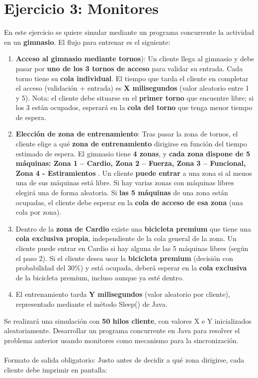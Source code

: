\documentclass[a4paper,12pt,titlepage,oneside]{article}
\begin{document}
\section{Ejercicio 3: Monitores}
\iffalse
    En este ejercicio se quiere simular mediante un programa concurrente la actividad en 
    un \textbf{gimnasio}. El flujo para entrenar es el siguiente: 
    \begin{enumerate}
        \item \textbf{Acceso al gimnasio mediante tornos}): Un cliente llega al gimnasio y debe pasar 
        por \textbf{uno de los 3 tornos de acceso} para validar su entrada. Cada torno tiene su \textbf{cola 
        individual}. El tiempo que tarda el cliente en completar el acceso (validación + entrada) 
        es \textbf{X milisegundos} (valor aleatorio entre 1 y 5). Nota: el cliente debe situarse en 
        el \textbf{primer torno} que encuentre libre; si los 3 están ocupados, esperará en la \textbf{cola del 
        torno} que tenga menor tiempo de espera. 
        \item \textbf{Elección de zona de entrenamiento}: Tras pasar la zona de tornos, el cliente elige a 
        qué \textbf{zona de entrenamiento} dirigirse en función del tiempo estimado de espera. El 
        gimnasio tiene \textbf{4 zonas}, y \textbf{cada zona dispone de 5 máquinas: Zona 1 – Cardio, Zona 
        2 – Fuerza, Zona 3 – Funcional, Zona 4 - Estiramientos} . Un cliente \textbf{puede entrar} a 
        una zona si al menos una de sus máquinas está libre. Si hay varias zonas con máquinas 
        libres elegirá una de forma aleatoria. Si \textbf{las 5 máquinas} de una zona están ocupadas, el 
        cliente debe esperar en la \textbf{cola de acceso de esa zona} (una cola por zona). 
        \item Dentro de la \textbf{zona de Cardio} existe una \textbf{bicicleta premium} que tiene una \textbf{cola 
        exclusiva propia}, independiente de la cola general de la zona. Un cliente puede entrar 
        en Cardio si hay alguna de las 5 máquinas libres (según el paso 2). Si el cliente desea 
        usar la \textbf{bicicleta premium} (decisión con probabilidad del 30\%) y está ocupada, deberá 
        esperar en la \textbf{cola exclusiva} de la bicicleta premium, incluso aunque ya esté dentro. 
        \item El entrenamiento tarda \textbf{Y milisegundos} (valor aleatorio por cliente), representado 
        mediante \textcolor{black!70}{el método Sleep() de Java}.
    \end{enumerate} 
    Se realizará una simulación con  \textbf{50 hilos cliente}, con valores X e Y inicializados 
    aleatoriamente. Desarrollar un programa concurrente en Java para resolver el problema anterior 
    usando monitores como mecanismo para la sincronización. \\
    \\
    Formato de salida obligatorio: Justo antes de decidir a qué zona dirigirse, cada cliente debe 
    imprimir en pantalla: \\
\end{document}
